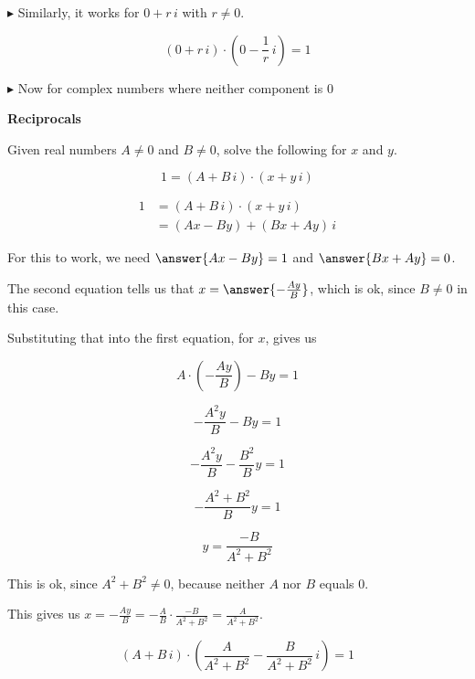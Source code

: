 \documentclass{ximera}
\begin{document}
$\blacktriangleright$  Similarly, it works for $0 + r \, i$ with $r \ne 0$.


\[   (0 + r \, i) \cdot \left(0 - \frac{1}{r} \, i \right) = 1        \]





$\blacktriangleright$ Now for complex numbers where neither component is $0$


\begin{explanation} \textbf{\textcolor{red!75!green}{Reciprocals}} 



Given real numbers $A \ne 0$ and $B \ne 0$, solve the following for $x$ and $y$.


\[       1 = (A + B \, i) \cdot (x + y \, i)            \]



\begin{align*}
1          & = (A + B \, i) \cdot (x + y \, i)      \\
           & = (Ax-By) + (Bx+Ay) \, i
\end{align*}


For this to work, we need $\answer{A x - B y} = 1$ and $\answer{B x + A y} = 0$.



The second equation tells us that $x = \answer{-\frac{A y}{B}}$, which is ok, since $B \ne 0$ in this case.

Substituting that into the first equation, for $x$, gives us


\[   A \cdot \left(-\frac{A y}{B}\right) - B y = 1     \]


\[   -\frac{A^2 y}{B} - B y = 1     \]

\[   -\frac{A^2 y}{B} - \frac{B^2}{B} y = 1     \]


\[   -\frac{A^2 + B^2}{B} y = 1     \]


\[  y = \frac{-B}{A^2 + B^2}     \]

This is ok, since $A^2 + B^2 \ne 0$, because neither $A$ nor $B$ equals $0$.



This gives us $x = -\frac{A y}{B} = -\frac{A}{B} \cdot \frac{-B}{A^2 + B^2} = \frac{A}{A^2 + B^2} $.







\[       (A + B \, i) \cdot \left( \frac{A}{A^2 + B^2} - \frac{B}{A^2 + B^2} \, i \right) = 1            \]



\end{explanation}
\end{document}
